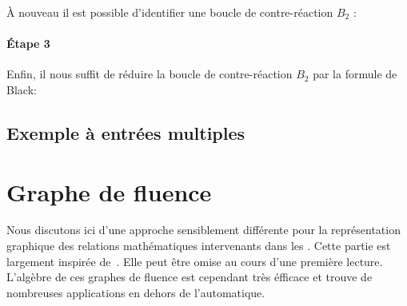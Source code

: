 \`A nouveau il est possible d'identifier une boucle de contre-réaction $B_2$ :

\begin{center}                                                                                                                
\end{center}                                                                                                                  

\paragraph{\'Etape 3}

Enfin, il nous suffit de réduire la boucle de contre-réaction $B_2$ par la formule de Black:

\begin{center}
\end{center}

\subsection{Exemple à entrées multiples}
\newpage

\section{Graphe de fluence}
Nous discutons ici d'une approche sensiblement différente 
pour la représentation graphique des relations mathématiques 
intervenants dans les \SLCI. Cette partie est largement
inspirée de~\cite{Ostertag}. Elle peut être omise au cours 
d'une première lecture. L'algèbre de ces graphes de fluence
est cependant très éfficace et trouve de nombreuses applications 
en dehors de l'automatique. 

